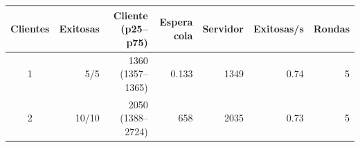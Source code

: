 \begin{tabular}{crrrrrr}
\toprule
Clientes & Exitosas & Cliente (p25--p75) & Espera cola & Servidor & Exitosas/s & Rondas \\
\midrule
1 & 5/5 & 1360 (1357--1365) & 0.133 & 1349 & 0.74 & 5 \\
2 & 10/10 & 2050 (1388--2724) & 658 & 2035 & 0.73 & 5 \\
\bottomrule
\end{tabular}
